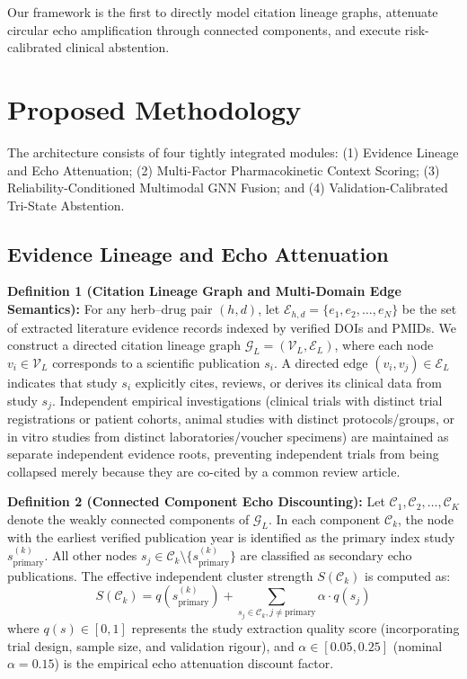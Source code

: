 \documentclass[10pt,journal,compsoc]{IEEEtran}
\begin{document}
Our framework is the first to directly model citation lineage graphs, attenuate circular echo amplification through connected components, and execute risk-calibrated clinical abstention.

\section{Proposed Methodology}

The architecture consists of four tightly integrated modules: (1) Evidence Lineage and Echo Attenuation; (2) Multi-Factor Pharmacokinetic Context Scoring; (3) Reliability-Conditioned Multimodal GNN Fusion; and (4) Validation-Calibrated Tri-State Abstention.

\subsection{Evidence Lineage and Echo Attenuation}
\textbf{Definition 1 (Citation Lineage Graph and Multi-Domain Edge Semantics):} For any herb--drug pair $(h, d)$, let $\mathcal{E}_{h,d} = \{e_1, e_2, \dots, e_N\}$ be the set of extracted literature evidence records indexed by verified DOIs and PMIDs. We construct a directed citation lineage graph $\mathcal{G}_L = (\mathcal{V}_L, \mathcal{E}_L)$, where each node $v_i \in \mathcal{V}_L$ corresponds to a scientific publication $s_i$. A directed edge $(v_i, v_j) \in \mathcal{E}_L$ indicates that study $s_i$ explicitly cites, reviews, or derives its clinical data from study $s_j$. Independent empirical investigations (clinical trials with distinct trial registrations or patient cohorts, animal studies with distinct protocols/groups, or in vitro studies from distinct laboratories/voucher specimens) are maintained as separate independent evidence roots, preventing independent trials from being collapsed merely because they are co-cited by a common review article.

\textbf{Definition 2 (Connected Component Echo Discounting):} Let $\mathcal{C}_1, \mathcal{C}_2, \dots, \mathcal{C}_K$ denote the weakly connected components of $\mathcal{G}_L$. In each component $\mathcal{C}_k$, the node with the earliest verified publication year is identified as the primary index study $s_{\text{primary}}^{(k)}$. All other nodes $s_j \in \mathcal{C}_k \setminus \{s_{\text{primary}}^{(k)}\}$ are classified as secondary echo publications. The effective independent cluster strength $S(\mathcal{C}_k)$ is computed as:
\begin{equation}
S(\mathcal{C}_k) = q(s_{\text{primary}}^{(k)}) + \sum_{s_j \in \mathcal{C}_k, j \neq \text{primary}} \alpha \cdot q(s_j)
\end{equation}
where $q(s) \in [0, 1]$ represents the study extraction quality score (incorporating trial design, sample size, and validation rigour), and $\alpha \in [0.05, 0.25]$ (nominal $\alpha = 0.15$) is the empirical echo attenuation discount factor.
\end{document}
